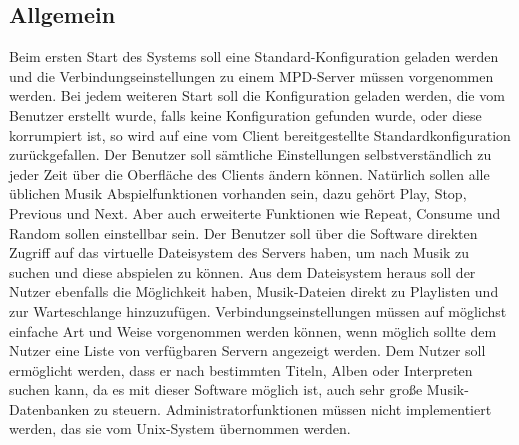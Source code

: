 \subsection{Allgemein}
Beim ersten Start des Systems soll eine Standard-Konfiguration geladen werden und die Verbindungseinstellungen
zu einem MPD-Server müssen vorgenommen werden. Bei jedem weiteren Start soll die Konfiguration geladen werden,
die vom Benutzer erstellt wurde, falls keine Konfiguration gefunden wurde, oder diese korrumpiert ist,
so wird auf eine vom Client bereitgestellte Standardkonfiguration zurückgefallen. Der Benutzer soll sämtliche
Einstellungen selbstverständlich zu jeder Zeit über die Oberfläche des Clients ändern können.
Natürlich sollen alle üblichen Musik Abspielfunktionen vorhanden sein, dazu gehört Play, Stop, Previous
und Next. Aber auch erweiterte Funktionen wie Repeat, Consume und Random sollen einstellbar sein.
Der Benutzer soll über die Software direkten Zugriff auf das virtuelle Dateisystem des Servers haben, um nach Musik zu suchen und
diese abspielen zu können. Aus dem Dateisystem heraus soll der Nutzer ebenfalls die Möglichkeit haben, Musik-Dateien
direkt zu Playlisten und zur Warteschlange hinzuzufügen.
Verbindungseinstellungen müssen auf möglichst einfache Art und Weise vorgenommen werden können, wenn möglich
sollte dem Nutzer eine Liste von verfügbaren Servern angezeigt werden. 
Dem Nutzer soll ermöglicht werden, dass er nach bestimmten Titeln, Alben oder Interpreten suchen kann, da 
es mit dieser Software möglich ist, auch sehr große Musik-Datenbanken zu steuern.
Administratorfunktionen müssen nicht implementiert werden, das sie vom Unix-System übernommen werden.

